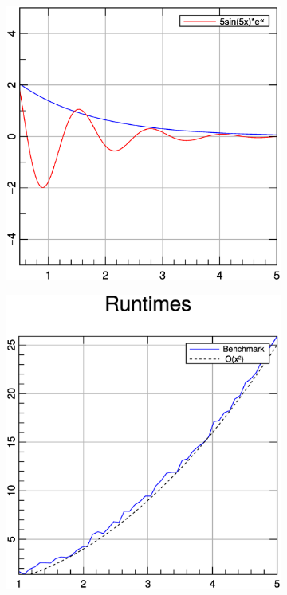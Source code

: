 \documentclass[a4paper]{article}
\begin{document}
\begin{figure}[h]
  \centering
  \begin{subfigure}[hb]{0.32\linewidth}
    \includegraphics[width=\textwidth]{./examples_from_doc/fplot/fplot_1.eps}
  \end{subfigure}
  \hspace{2cm}
  \begin{subfigure}[hb]{0.32\linewidth}
    \includegraphics[width=\textwidth]{./examples_from_doc/fplot/fplot_2.eps}
  \end{subfigure}
\end{figure}
\end{document}
